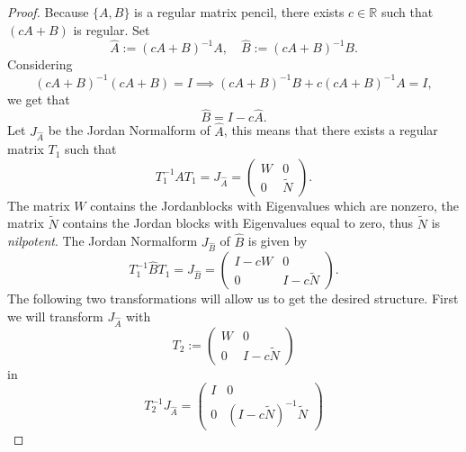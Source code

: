 \begin{proof}
	Because $\{A,B\}$ is a regular matrix pencil, there exists $c \in \mathbb{R}$ such that $(cA+B)$ is regular. Set
	\begin{displaymath}
		\hat{A} := (cA+B)^{-1}A, \quad \hat{B} := (cA+B)^{-1}B.
	\end{displaymath}
	Considering 
	\begin{displaymath}
		(cA+B)^{-1}(cA+B) = I \implies (cA+B)^{-1}B+c(cA+B)^{-1}A = I ,
	\end{displaymath}
	we get that
	\begin{displaymath}
		\hat{B} = I-c \hat{A} .
	\end{displaymath}
	Let $J_ {\hat{A}}$ be the Jordan Normalform of $\hat{A}$, this means that there exists a regular matrix $T_1$ such that
	\begin{displaymath}
		T_1^{-1}AT_1 = J_{\hat{A}} =
		\left(
		\begin{matrix}
			W & 0 \\
			0 & \tilde{N} 
		\end{matrix}
		\right) .
	\end{displaymath}
	The matrix $W$ contains the Jordanblocks with Eigenvalues which are nonzero, the matrix $\tilde{N}$ contains the Jordan blocks with Eigenvalues equal to zero, thus $\tilde{N}$ is \emph{nilpotent}.
	The Jordan Normalform $J_{\hat{B}}$ of $\hat{B}$ is given by
	\begin{displaymath}
		T_1^{-1} \hat{B} T_1 = J_{\hat{B}} = 
		\left(
		\begin{matrix}
			I-cW & 0 \\
			0 & I-c\tilde{N}
		\end{matrix}
		\right) .
	\end{displaymath}
	The following two transformations will allow us to get the desired structure.
	First we will transform $J_{\hat{A}}$ with
	\begin{displaymath}
		T_2 :=
		\left(
		\begin{matrix}
			W & 0 \\
			0 & I-c\tilde{N}
		\end{matrix}
		\right)
	\end{displaymath}
	in
	\begin{displaymath}
		T_2^{-1}J_{\hat{A}} = 
		\left(
		\begin{matrix}
			I & 0 \\
			0 & (I-c\tilde{N})^{-1}\tilde{N}
		\end{matrix}
		\right)
	\end{displaymath}

\end{proof}
